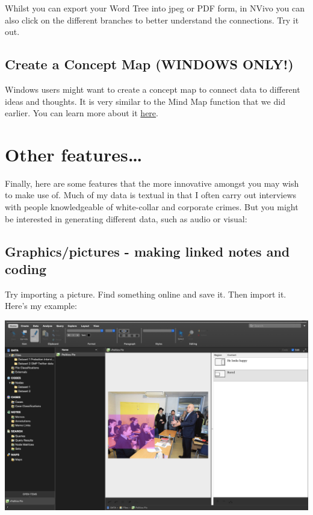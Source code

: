 \documentclass[
]{book}
\begin{document}
Whilst you can export your Word Tree into jpeg or PDF form, in NVivo you can also click on the different branches to better understand the connections. Try it out.

\hypertarget{create-a-concept-map-windows-only}{%
\subsection{Create a Concept Map (WINDOWS ONLY!)}\label{create-a-concept-map-windows-only}}

Windows users might want to create a concept map to connect data to different ideas and thoughts. It is very similar to the Mind Map function that we did earlier. You can learn more about it \href{https://www.youtube.com/watch?v=NRSPP6eZd0s}{here}.

\hypertarget{other-features}{%
\section{Other features\ldots{}}\label{other-features}}

Finally, here are some features that the more innovative amongst you may wish to make use of. Much of my data is textual in that I often carry out interviews with people knowledgeable of white-collar and corporate crimes. But you might be interested in generating different data, such as audio or visual:

\hypertarget{graphicspictures---making-linked-notes-and-coding}{%
\subsection{Graphics/pictures - making linked notes and coding}\label{graphicspictures---making-linked-notes-and-coding}}

Try importing a picture. Find something online and save it. Then import it. Here's my example:

\includegraphics{imgs/code_pic.png}
\end{document}
